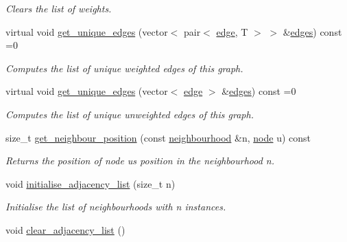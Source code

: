 \begin{DoxyCompactItemize}
\begin{DoxyCompactList}\small\item\em Clears the list of weights. \end{DoxyCompactList}\item 
virtual void \hyperlink{classlgraph_1_1utils_1_1wxgraph_a2cf8037faaa1a2fd081e3d58e55a1932}{get\+\_\+unique\+\_\+edges} (vector$<$ pair$<$ \hyperlink{namespacelgraph_1_1utils_a6510284ce1b1ae5dc97ce5d2de426e10}{edge}, T $>$ $>$ \&\hyperlink{classlgraph_1_1utils_1_1wxgraph_a73b6c8887d5088750ee2cc98c45089c6}{edges}) const =0
\begin{DoxyCompactList}\small\item\em Computes the list of unique weighted edges of this graph. \end{DoxyCompactList}\item 
virtual void \hyperlink{classlgraph_1_1utils_1_1wxgraph_aaafce72400fb01e86b6c9f85a17406d0}{get\+\_\+unique\+\_\+edges} (vector$<$ \hyperlink{namespacelgraph_1_1utils_a6510284ce1b1ae5dc97ce5d2de426e10}{edge} $>$ \&\hyperlink{classlgraph_1_1utils_1_1wxgraph_a73b6c8887d5088750ee2cc98c45089c6}{edges}) const =0
\begin{DoxyCompactList}\small\item\em Computes the list of unique unweighted edges of this graph. \end{DoxyCompactList}\item 
size\+\_\+t \hyperlink{classlgraph_1_1utils_1_1xxgraph_aac7ef2134cad9529869f1334de7892d9}{get\+\_\+neighbour\+\_\+position} (const \hyperlink{namespacelgraph_1_1utils_a0f2ef47028a466d26841709e705390ac}{neighbourhood} \&n, \hyperlink{namespacelgraph_1_1utils_a7bd66ede3805ef121bc2835bd48de0cf}{node} u) const 
\begin{DoxyCompactList}\small\item\em Returns the position of node {\itshape u\textquotesingle{}s} position in the neighbourhood {\itshape n}. \end{DoxyCompactList}\item 
void \hyperlink{classlgraph_1_1utils_1_1xxgraph_a2201aaff5e9ffa29a9b3abfde705dd46}{initialise\+\_\+adjacency\+\_\+list} (size\+\_\+t n)\hypertarget{classlgraph_1_1utils_1_1xxgraph_a2201aaff5e9ffa29a9b3abfde705dd46}{}\label{classlgraph_1_1utils_1_1xxgraph_a2201aaff5e9ffa29a9b3abfde705dd46}

\begin{DoxyCompactList}\small\item\em Initialise the list of neighbourhoods with {\itshape n} instances. \end{DoxyCompactList}\item 
void \hyperlink{classlgraph_1_1utils_1_1xxgraph_a6523402d0ec66918b95de23d2bee38fc}{clear\+\_\+adjacency\+\_\+list} ()\hypertarget{classlgraph_1_1utils_1_1xxgraph_a6523402d0ec66918b95de23d2bee38fc}{}\label{classlgraph_1_1utils_1_1xxgraph_a6523402d0ec66918b95de23d2bee38fc}


\end{DoxyCompactItemize}

